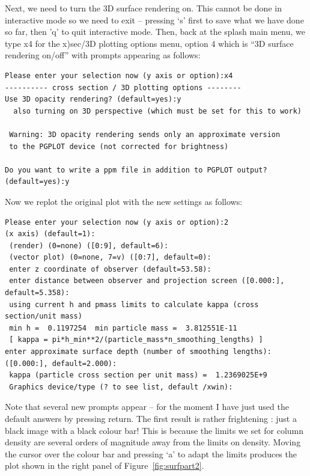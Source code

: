 \documentclass[a4paper,11pt]{article}
\begin{document}
 Next, we need to turn the 3D surface rendering on. This cannot be done in interactive mode so we need to exit -- pressing `s' first to save what we have done so far, then 'q' to quit interactive mode. Then, back at the splash main menu, we type x4 for the x)sec/3D plotting options menu, option 4 which is ``3D surface rendering on/off'' with prompts appearing as follows:
\begin{verbatim}
Please enter your selection now (y axis or option):x4
---------- cross section / 3D plotting options --------
Use 3D opacity rendering? (default=yes):y
  also turning on 3D perspective (which must be set for this to work)

 Warning: 3D opacity rendering sends only an approximate version 
 to the PGPLOT device (not corrected for brightness) 

Do you want to write a ppm file in addition to PGPLOT output? (default=yes):y
\end{verbatim}
Now we replot the original plot with the new settings as follows:
\begin{verbatim}
Please enter your selection now (y axis or option):2
(x axis) (default=1):
 (render) (0=none) ([0:9], default=6):
 (vector plot) (0=none, 7=v) ([0:7], default=0):
 enter z coordinate of observer (default=53.58):
 enter distance between observer and projection screen ([0.000:], default=5.358):
 using current h and pmass limits to calculate kappa (cross section/unit mass)
 min h =  0.1197254  min particle mass =  3.812551E-11
 [ kappa = pi*h_min**2/(particle_mass*n_smoothing_lengths) ]
enter approximate surface depth (number of smoothing lengths): ([0.000:], default=2.000):
 kappa (particle cross section per unit mass) =  1.2369025E+9
 Graphics device/type (? to see list, default /xwin): 
\end{verbatim}
Note that several new prompts appear -- for the moment I have just used the default answers by pressing return. The first result is rather frightening : just a black image with a black colour bar! This is because the limits we set for column density are several orders of magnitude away from the limits on density. Moving the cursor over the colour bar and pressing `a' to adapt the limits produces the plot shown in the right panel of Figure~\ref{fig:surfpart2}.
\end{document}
